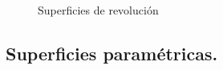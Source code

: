 \begin{figure}[H]
\qquad
{}%
\caption{Superficies de revolución}%
\label{fig:example}%
\end{figure}

\subsection{Superficies paramétricas.}

